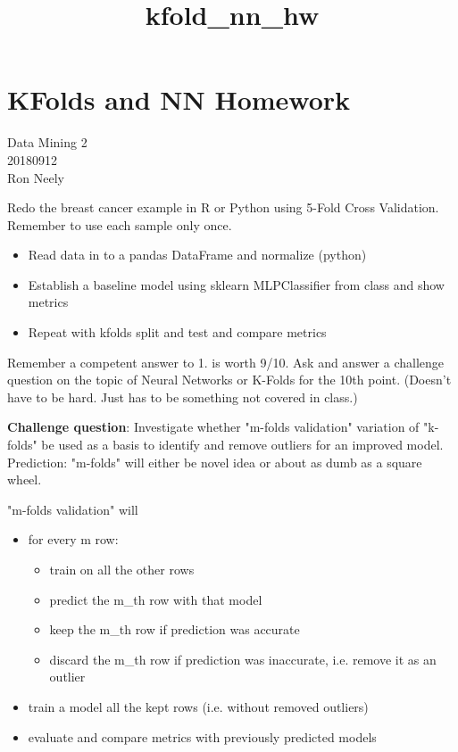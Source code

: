 \documentclass[11pt]{article}
\title{kfold\_nn\_hw}
\providecommand{\tightlist}{%
      \setlength{\itemsep}{0pt}\setlength{\parskip}{0pt}}
\begin{document}
    
    
    \maketitle
    
    

    
    \section{KFolds and NN Homework}\label{kfolds-and-nn-homework}

Data Mining 2\\
20180912\\
Ron Neely

Redo the breast cancer example in R or Python using 5-Fold Cross
Validation. Remember to use each sample only once.

\begin{itemize}
\tightlist
\item
  Read data in to a pandas DataFrame and normalize (python)
\item
  Establish a baseline model using sklearn MLPClassifier from class and
  show metrics
\item
  Repeat with kfolds split and test and compare metrics
\end{itemize}

Remember a competent answer to 1. is worth 9/10. Ask and answer a
challenge question on the topic of Neural Networks or K-Folds for the
10th point. (Doesn't have to be hard. Just has to be something not
covered in class.)

\textbf{Challenge question}: Investigate whether "m-folds validation"
variation of "k-folds" be used as a basis to identify and remove
outliers for an improved model. Prediction: "m-folds" will either be
novel idea or about as dumb as a square wheel.

"m-folds validation" will

\begin{itemize}
\tightlist
\item
  for every m row:

  \begin{itemize}
  \tightlist
  \item
    train on all the other rows
  \item
    predict the m\_th row with that model
  \item
    keep the m\_th row if prediction was accurate
  \item
    discard the m\_th row if prediction was inaccurate, i.e. remove it
    as an outlier
  \end{itemize}
\item
  train a model all the kept rows (i.e. without removed outliers)
\item
  evaluate and compare metrics with previously predicted models
\end{itemize}
\end{document}
